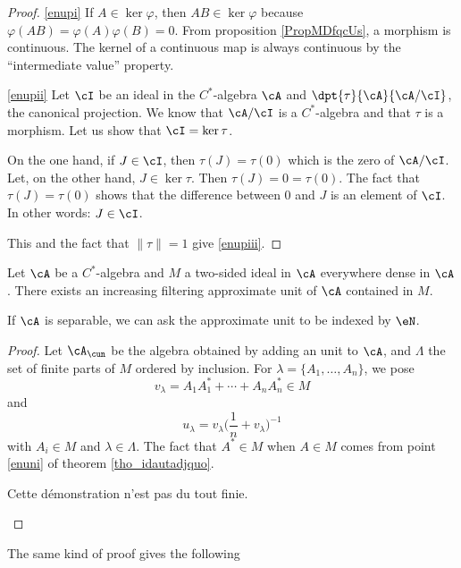 \begin{proof}
    \ref{enupi} If $A\in\ker\varphi$, then $AB\in\ker\varphi$ because $\varphi(AB)=\varphi(A)\varphi(B)=0$. From proposition \ref{PropMDfqcUs}, a morphism is continuous. The kernel of a continuous map is always continuous by the ``intermediate value'' property.

    \ref{enupii} Let $\cI$ be an ideal in the $C^*$-algebra $\cA$ and $\dpt{\tau}{\cA}{\cA/\cI}$, the canonical projection. We know that $\cA/\cI$ is a $C^*$-algebra and that $\tau$ is a morphism. Let us show that $\cI=\ker\tau$.

    On the one hand, if $J\in\cI$, then $\tau(J)=\tau(0)$ which is the zero of $\cA/\cI$. Let, on the other hand, $J\in\ker\tau$. Then $\tau(J)=0=\tau(0)$. The fact that $\tau(J)=\tau(0)$ shows that the difference between $0$ and $J$ is an element of $\cI$. In other words: $J\in\cI$.

    This and the fact that $\| \tau \|=1$ give \ref{enupiii}.
\end{proof}


\begin{proposition} 
Let $\cA$ be a $C^*$-algebra  and $M$ a two-sided ideal in $\cA$ everywhere dense in $\cA$. There exists an increasing filtering approximate unit of $\cA$ contained in $M$.

If $\cA$ is separable, we can ask the approximate unit to be indexed by $\eN$.

\end{proposition}
\begin{proof}
Let $\cA_{\cun}$ be the algebra obtained by adding an unit to $\cA$, and $\Lambda$ the set of finite parts of $M$ ordered by inclusion. For $\lambda=\{ A_1,\ldots, A_n \}$, we pose
\[ 
  v_{\lambda}=A_1A_1^*+\cdots+A_nA_n^*\in M
\]
 and 
\[ 
  u_{\lambda}=v_{\lambda}\big( \frac{1}{ n }+v_{\lambda} \big)^{-1}
\]
with $A_i\in M$ and $\lambda\in\Lambda$. The fact that $A^*\in M$ when $A\in M$ comes from point \ref{enuni} of theorem \ref{tho_idautadjquo}.

\begin{probleme}
Cette démonstration n'est pas du tout finie.
\end{probleme}

\end{proof}

The same kind of proof gives the following

